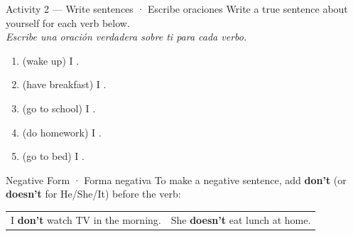 \vspace{14pt}

\begin{activity}{Activity 2 — Write sentences · Escribe oraciones}
Write a true sentence about yourself for each verb below. \\
\textit{Escribe una oración verdadera sobre ti para cada verbo.}

\medskip
\begin{enumerate}
  \item (wake up) I \answerline[8cm].
  \item (have breakfast) I \answerline[8cm].
  \item (go to school) I \answerline[8cm].
  \item (do homework) I \answerline[8cm].
  \item (go to bed) I \answerline[8cm].
\end{enumerate}
\end{activity}

\vspace{14pt}

\begin{grammartip}{Negative Form · Forma negativa}
To make a negative sentence, add \textbf{don't} (or \textbf{doesn't} for He/She/It) before the verb:

\medskip
\begin{center}
\begin{tabular}{ll}
I \textbf{don't} watch TV in the morning. & She \textbf{doesn't} eat lunch at home. \\
\end{tabular}
\end{center}
\end{grammartip}
